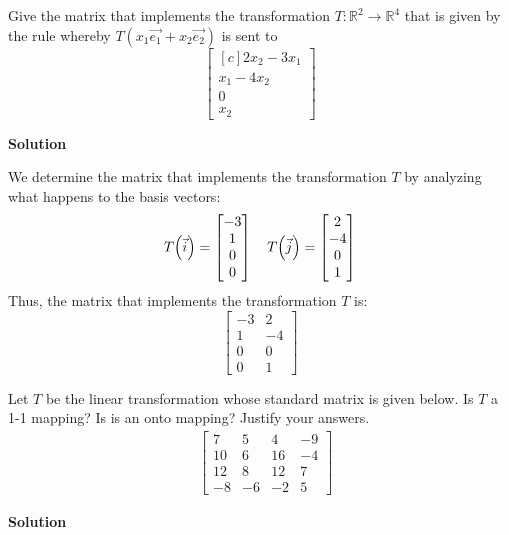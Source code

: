 \documentclass[11pt]{scrartcl}
\theoremstyle{dotlessP}
\theoremstyle{dotlessN}
\DeclarePairedDelimiter\paren{(}{)} %
\begin{document}
\begin{ques}
	Give the matrix that implements the transformation $T: \mathbb{R}^2 \to \mathbb{R}^4$ that is given by the rule whereby $T(x_1\vec{e_1} + x_2\vec{e_2})$ is sent to 
\[
	\begin{bmatrix}[c]
        2x_2-3x_1 \\ x_1-4x_2 \\ 0 \\ x_2
    \end{bmatrix}
\] 
\end{ques}
\textbf{Solution}

We determine the matrix that implements the transformation $T$ by analyzing what happens to the basis vectors:
 \begin{align*}
	 T\paren*{\vec{i}
	 } = 
	 \begin{bmatrix}
	 	-3 \\
		1 \\
		0 \\
		0
	 \end{bmatrix} \quad
	 T
	 \paren*{\vec{j}
	 } =
	 \begin{bmatrix}
	 	2 \\
		-4 \\
		0 \\
		1
	 \end{bmatrix}
\end{align*}
Thus, the matrix that implements the transformation $T$ is:
\[
\begin{bmatrix}
	-3 & 2 \\
	1 & -4 \\
	0 & 0 \\
	0 & 1
\end{bmatrix}
\] 
\begin{ques}
	Let $T$ be the linear transformation whose standard matrix is given below. Is $T$ a 1-1 mapping? Is is an onto mapping? Justify your answers. 
\begin{align*}
    &\begin{bmatrix}
        7 & 5 & 4 & -9 \\ 10 & 6 & 16 & -4 \\ 12 & 8 & 12 & 7 \\ -8 & -6 & -2 & 5
    \end{bmatrix} 
\end{align*}
\end{ques}
\textbf{Solution}
\end{document}
